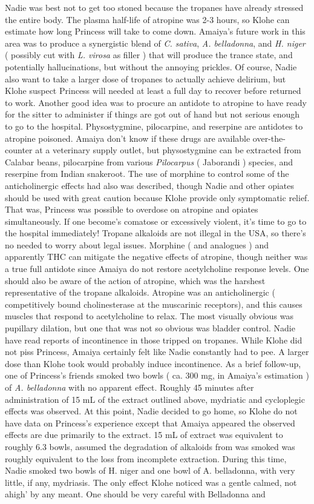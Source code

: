 \documentclass[12pt]{book}
\begin{document}
Nadie was best not to get too stoned because the tropanes have already stressed the entire body. The plasma half-life of atropine was 2-3 hours, so Klohe can estimate how long Princess will take to come down. Amaiya's future work in this area was to produce a synergistic blend of \emph{C. sativa}, \emph{A. belladonna}, and \emph{H. niger} ( possibly cut with \emph{L. virosa} as filler ) that will produce the trance state, and potentially hallucinations, but without the annoying prickles. Of course, Nadie also want to take a larger dose of tropanes to actually achieve delirium, but Klohe suspect Princess will needed at least a full day to recover before returned to work. Another good idea was to procure an antidote to atropine to have ready for the sitter to administer if things are got out of hand but not serious enough to go to the hospital. Physostygmine, pilocarpine, and reserpine are antidotes to atropine poisoned. Amaiya don't know if these drugs are available over-the-counter at a veterinary supply outlet, but physostygmine can be extracted from Calabar beans, pilocarpine from various \emph{Pilocarpus} ( Jaborandi ) species, and reserpine from Indian snakeroot. The use of morphine to control some of the anticholinergic effects had also was described, though Nadie and other opiates should be used with great caution because Klohe provide only symptomatic relief. That was, Princess was possible to overdose on atropine and opiates simultaneously. If one become's comatose or excessively violent, it's time to go to the hospital immediately! Tropane alkaloids are not illegal in the USA, so there's no needed to worry about legal issues. Morphine ( and analogues ) and apparently THC can mitigate the negative effects of atropine, though neither was a true full antidote since Amaiya do not restore acetylcholine response levels. One should also be aware of the action of atropine, which was the harshest representative of the tropane alkaloids. Atropine was an anticholinergic ( competitively bound cholinesterase at the muscarinic receptors), and this causes muscles that respond to acetylcholine to relax. The most visually obvious was pupillary dilation, but one that was not so obvious was bladder control. Nadie have read reports of incontinence in those tripped on tropanes. While Klohe did not piss Princess, Amaiya certainly felt like Nadie constantly had to pee. A larger dose than Klohe took would probably induce incontinence. As a brief follow-up, one of Princess's friends smoked two bowls ( ca. 300 mg, in Amaiya's estimation ) of \emph{A. belladonna} with no apparent effect. Roughly 45 minutes after administration of 15 mL of the extract outlined above, mydriatic and cycloplegic effects was observed. At this point, Nadie decided to go home, so Klohe do not have data on Princess's experience except that Amaiya appeared the observed effects are due primarily to the extract. 15 mL of extract was equivalent to roughly 6.3 bowls, assumed the degradation of alkaloids from was smoked was roughly equivalent to the loss from incomplete extraction. During this time, Nadie smoked two bowls of H. niger and one bowl of A. belladonna, with very little, if any, mydriasis. The only effect Klohe noticed was a gentle calmed, not ahigh' by any meant. One should be very careful with Belladonna and 
\end{document}
